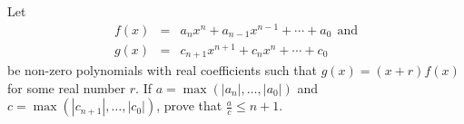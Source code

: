Let
\begin{eqnarray*} f(x) & = & a_n x^n + a_{n-1} x^{n-1} + \cdots + a_0 \ \ \text{and} \\ g(x) & = & c_{n+1} x^{n+1} + c_n x^n + \cdots + c_0 \end{eqnarray*}
be non-zero polynomials with real coefficients such that $g(x) = (x+r)f(x)$ for some real number $r$.  If $a = \max(|a_n|, \ldots, |a_0|)$ and $c = \max(|c_{n+1}|, \ldots, |c_0|)$, prove that $\frac{a}{c} \leq n+1$.